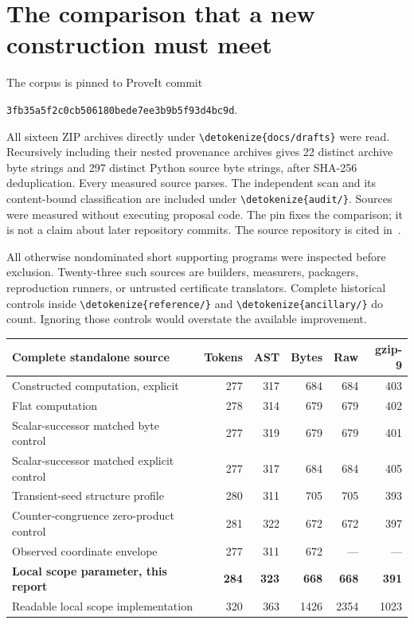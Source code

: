 \documentclass[11pt,letterpaper]{article}
\theoremstyle{definition}\newtheorem{definition}[theorem]{Definition}
\theoremstyle{remark}\newtheorem{remark}[theorem]{Remark}
\newcommand{\file}[1]{\expandafter\nolinkurl\expandafter{\detokenize{#1}}}
\begin{document}
\section{The comparison that a new construction must meet}
\label{sec:comparison}

The corpus is pinned to ProveIt commit
\begin{center}\small\texttt{3fb35a5f2c0cb506180bede7ee3b9b5f93d4bc9d}.\end{center}
All sixteen ZIP archives directly under \file{docs/drafts} were read.
Recursively including their nested provenance archives gives 22 distinct
archive byte strings and 297 distinct Python source byte strings, after
SHA-256 deduplication. Every measured source parses. The independent
scan and its content-bound classification are included under
\file{audit/}. Sources were measured without executing proposal code.
The pin fixes the comparison; it is not a claim about later repository
commits. The source repository is cited in~\cite{snapshot}.

All otherwise nondominated short supporting programs were inspected
before exclusion. Twenty-three such sources are builders, measurers,
packagers, reproduction runners, or untrusted certificate translators.
Complete historical controls inside \file{reference/} and
\file{ancillary/} do count. Ignoring those controls would overstate the
available improvement.

\begin{center}\small
\begin{tabular}{lrrrrr}
\toprule
Complete standalone source & Tokens & AST & Bytes & Raw & gzip-9\\
\midrule
Constructed computation, explicit &277&317&684&684&403\\
Flat computation &278&314&679&679&402\\
Scalar-successor matched byte control &277&319&679&679&401\\
Scalar-successor matched explicit control &277&317&684&684&405\\
Transient-seed structure profile &280&311&705&705&393\\
Counter-congruence zero-product control &281&322&672&672&397\\
\midrule
Observed coordinate envelope &277&311&672&---&---\\
\textbf{Local scope parameter, this report}&\textbf{284}&\textbf{323}&\textbf{668}&\textbf{668}&\textbf{391}\\
Readable local scope implementation &320&363&1426&2354&1023\\
\bottomrule
\end{tabular}
\end{center}
\end{document}
